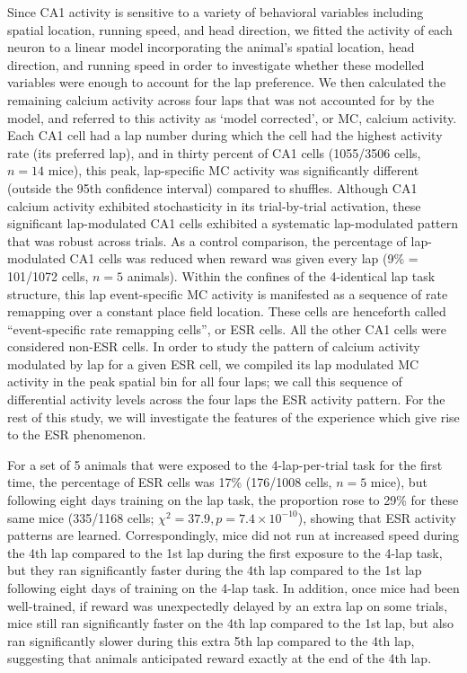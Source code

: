 Since CA1 activity is sensitive to a variety of behavioral variables including spatial location, running speed, and head direction, we fitted the activity of each neuron to a linear model incorporating the animal's spatial location, head direction, and running speed in order to investigate whether these modelled variables were enough to account for the lap preference. We then calculated the remaining calcium activity across four laps that was not accounted for by the model, and referred to this activity as `model corrected', or MC, calcium activity. Each CA1 cell had a lap number during which the cell had the highest activity rate (its preferred lap), and in thirty percent of CA1 cells (1055/3506 cells, $n = 14$ mice), this peak, lap-specific MC activity was significantly different (outside the 95th confidence interval) compared to shuffles. Although CA1 calcium activity exhibited stochasticity in its trial-by-trial activation, these significant lap-modulated CA1 cells exhibited a systematic lap-modulated pattern that was robust across trials. As a control comparison, the percentage of lap-modulated CA1 cells was reduced when reward was given every lap (9\% = 101/1072 cells, $n= 5$ animals). Within the confines of the 4-identical lap task structure, this lap event-specific MC activity is manifested as a sequence of rate remapping over a constant place field location. These cells are henceforth called ``event-specific rate remapping cells'', or ESR cells. All the other CA1 cells were considered non-ESR cells. In order to study the pattern of calcium activity modulated by lap for a given ESR cell, we compiled its lap modulated MC activity in the peak spatial bin for all four laps; we call this sequence of differential activity levels across the four laps the ESR activity pattern. For the rest of this study, we will investigate the features of the experience which give rise to the ESR phenomenon.

For a set of 5 animals that were exposed to the 4-lap-per-trial task for the first time, the percentage of ESR cells was 17\% (176/1008 cells, $n=5$ mice), but following eight days training on the lap task, the proportion rose to 29\% for these same mice (335/1168 cells; $\chi^2 =37.9, p = 7.4 \times 10^{-10}$), showing that ESR activity patterns are learned. Correspondingly, mice did not run at increased speed during the 4th lap compared to the 1st lap during the first exposure to the 4-lap task, but they ran significantly faster during the 4th lap compared to the 1st lap following eight days of training on the 4-lap task. In addition, once mice had been well-trained, if reward was unexpectedly delayed by an extra lap on some trials, mice still ran significantly faster on the 4th lap compared to the 1st lap, but also ran significantly slower during this extra 5th lap compared to the 4th lap, suggesting that animals anticipated reward exactly at the end of the 4th lap.

